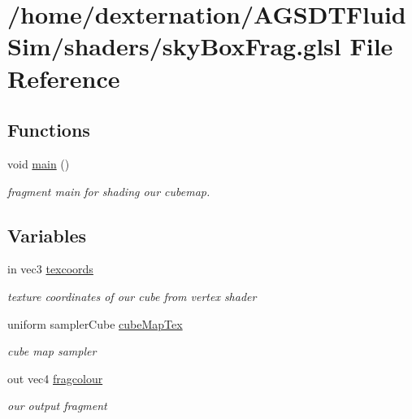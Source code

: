 \hypertarget{sky_box_frag_8glsl}{\section{/home/dexternation/\-A\-G\-S\-D\-T\-Fluid\-Sim/shaders/sky\-Box\-Frag.glsl File Reference}
\label{sky_box_frag_8glsl}
}
\subsection*{Functions}
\begin{DoxyCompactItemize}
\item 
\hypertarget{sky_box_frag_8glsl_acdef7a1fd863a6d3770c1268cb06add3}{void \hyperlink{sky_box_frag_8glsl_acdef7a1fd863a6d3770c1268cb06add3}{main} ()}\label{sky_box_frag_8glsl_acdef7a1fd863a6d3770c1268cb06add3}

\begin{DoxyCompactList}\small\item\em fragment main for shading our cubemap. \end{DoxyCompactList}\end{DoxyCompactItemize}
\subsection*{Variables}
\begin{DoxyCompactItemize}
\item 
\hypertarget{sky_box_frag_8glsl_a4989ba8cb91a639702eb2204f23cf73f}{in vec3 \hyperlink{sky_box_frag_8glsl_a4989ba8cb91a639702eb2204f23cf73f}{texcoords}}\label{sky_box_frag_8glsl_a4989ba8cb91a639702eb2204f23cf73f}

\begin{DoxyCompactList}\small\item\em texture coordinates of our cube from vertex shader \end{DoxyCompactList}\item 
\hypertarget{sky_box_frag_8glsl_a9dac566b8dcb58f380dec54a9a51b3fa}{uniform sampler\-Cube \hyperlink{sky_box_frag_8glsl_a9dac566b8dcb58f380dec54a9a51b3fa}{cube\-Map\-Tex}}\label{sky_box_frag_8glsl_a9dac566b8dcb58f380dec54a9a51b3fa}

\begin{DoxyCompactList}\small\item\em cube map sampler \end{DoxyCompactList}\item 
\hypertarget{sky_box_frag_8glsl_ae6bde93c13ab90b831d2986a7de2d347}{out vec4 \hyperlink{sky_box_frag_8glsl_ae6bde93c13ab90b831d2986a7de2d347}{fragcolour}}\label{sky_box_frag_8glsl_ae6bde93c13ab90b831d2986a7de2d347}

\begin{DoxyCompactList}\small\item\em our output fragment \end{DoxyCompactList}\end{DoxyCompactItemize}


